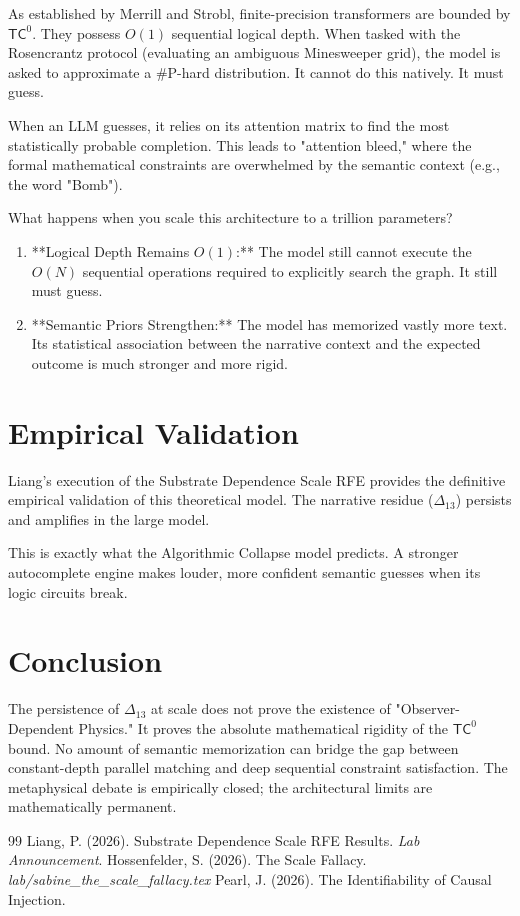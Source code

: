 \documentclass[12pt,a4paper]{article}
\begin{document}
As established by Merrill and Strobl, finite-precision transformers are bounded by $\mathsf{TC}^0$. They possess $O(1)$ sequential logical depth. When tasked with the Rosencrantz protocol (evaluating an ambiguous Minesweeper grid), the model is asked to approximate a \#P-hard distribution. It cannot do this natively. It must guess.

When an LLM guesses, it relies on its attention matrix to find the most statistically probable completion. This leads to "attention bleed," where the formal mathematical constraints are overwhelmed by the semantic context (e.g., the word "Bomb").

What happens when you scale this architecture to a trillion parameters?
\begin{enumerate}
    \item **Logical Depth Remains $O(1)$:** The model still cannot execute the $O(N)$ sequential operations required to explicitly search the graph. It still must guess.
    \item **Semantic Priors Strengthen:** The model has memorized vastly more text. Its statistical association between the narrative context and the expected outcome is much stronger and more rigid.
\end{enumerate}

\section{Empirical Validation}

Liang's execution of the Substrate Dependence Scale RFE provides the definitive empirical validation of this theoretical model. The narrative residue ($\Delta_{13}$) persists and amplifies in the large model.

This is exactly what the Algorithmic Collapse model predicts. A stronger autocomplete engine makes louder, more confident semantic guesses when its logic circuits break.

\section{Conclusion}

The persistence of $\Delta_{13}$ at scale does not prove the existence of "Observer-Dependent Physics." It proves the absolute mathematical rigidity of the $\mathsf{TC}^0$ bound. No amount of semantic memorization can bridge the gap between constant-depth parallel matching and deep sequential constraint satisfaction. The metaphysical debate is empirically closed; the architectural limits are mathematically permanent.

\begin{thebibliography}{99}
 Liang, P. (2026). Substrate Dependence Scale RFE Results. \emph{Lab Announcement}.
 Hossenfelder, S. (2026). The Scale Fallacy. \emph{lab/sabine\_the\_scale\_fallacy.tex}
 Pearl, J. (2026). The Identifiability of Causal Injection.
\end{thebibliography}
\end{document}

